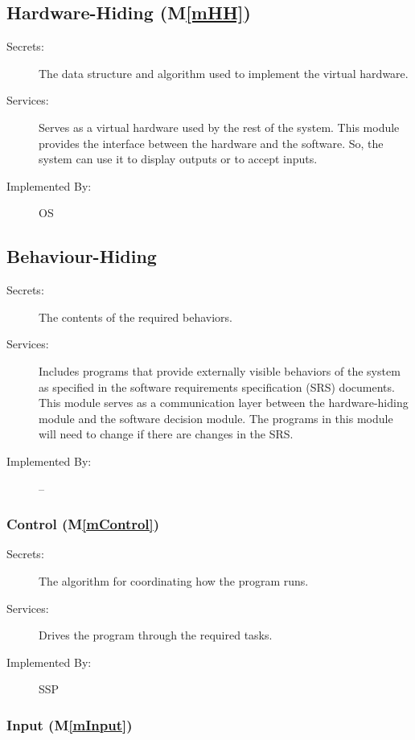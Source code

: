 \documentclass[12pt, titlepage]{article}
\newcommand{\progname}{SSP}
\newcommand{\mref}[1]{M\ref{#1}}
\begin{document}
\subsection{Hardware-Hiding (\mref{mHH})}

\begin{description}
\item[Secrets:]The data structure and algorithm used to implement the
  virtual hardware.
\item[Services:]Serves as a virtual hardware used by the rest of the
  system. This module provides the interface between the hardware and
  the software. So, the system can use it to display outputs or to
  accept inputs.
\item[Implemented By:] OS
\end{description}

\subsection{Behaviour-Hiding}

\begin{description}
\item[Secrets:]The contents of the required behaviors.
\item[Services:]Includes programs that provide externally visible
  behaviors of the system as specified in the software requirements
  specification (SRS) documents. This module serves as a communication
  layer between the hardware-hiding module and the software decision
  module. The programs in this module will need to change if there are
  changes in the SRS.
\item[Implemented By:] --
\end{description}

\subsubsection{Control (\mref{mControl})}

\begin{description}
\item[Secrets:] The algorithm for coordinating how the program runs.
\item[Services:] Drives the program through the required tasks.
\item[Implemented By:] \progname
\end{description}


\subsubsection{Input (\mref{mInput})}
\end{document}
